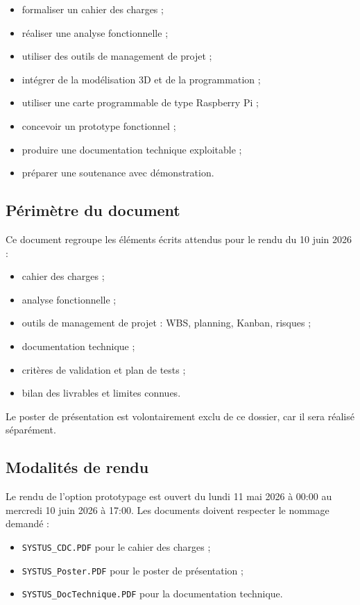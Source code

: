 \begin{itemize}
    \item formaliser un cahier des charges ;
    \item réaliser une analyse fonctionnelle ;
    \item utiliser des outils de management de projet ;
    \item intégrer de la modélisation 3D et de la programmation ;
    \item utiliser une carte programmable de type Raspberry Pi ;
    \item concevoir un prototype fonctionnel ;
    \item produire une documentation technique exploitable ;
    \item préparer une soutenance avec démonstration.
\end{itemize}

\subsection{Périmètre du document}

Ce document regroupe les éléments écrits attendus pour le rendu du 10 juin 2026
:

\begin{itemize}
    \item cahier des charges ;
    \item analyse fonctionnelle ;
    \item outils de management de projet : WBS, planning, Kanban, risques ;
    \item documentation technique ;
    \item critères de validation et plan de tests ;
    \item bilan des livrables et limites connues.
\end{itemize}

Le poster de présentation est volontairement exclu de ce dossier, car il sera
réalisé séparément.

\subsection{Modalités de rendu}

Le rendu de l'option prototypage est ouvert du lundi 11 mai 2026 à 00:00 au
mercredi 10 juin 2026 à 17:00. Les documents doivent respecter le nommage
demandé :

\begin{itemize}
    \item \texttt{SYSTUS\_CDC.PDF} pour le cahier des charges ;
    \item \texttt{SYSTUS\_Poster.PDF} pour le poster de présentation ;
    \item \texttt{SYSTUS\_DocTechnique.PDF} pour la documentation technique.
\end{itemize}

